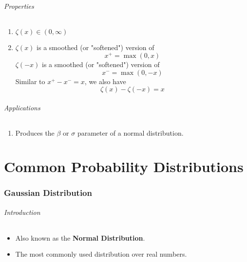 \documentclass[12pt, a4paper]{article}
\begin{document}
\paragraph{Properties}
\begin{enumerate}
    \item $\zeta(x) \in (0, \infty)$
    \item $\zeta(x)$ is a smoothed (or "softened") version of
        \[
            x^+ = \max(0, x)  
        \]
        $\zeta(-x)$ is a smoothed (or "softened") version of
        \[
            x^- = \max(0, -x)  
        \]
        Similar to $x^+ - x^- = x$, we also have
        \[
            \zeta(x) - \zeta(-x) = x
        \]
\end{enumerate}
\paragraph{Applications}
\begin{enumerate}
    \item Produces the $\beta$ or $\sigma$ parameter of a normal distribution.
\end{enumerate}


\newpage
\part{Common Probability Distributions}


\section{Gaussian Distribution}
\paragraph{Introduction}
\begin{itemize}
    \item Also known as the \textbf{Normal Distribution}.
    \item The most commonly used distribution over real numbers.
\end{itemize}
\end{document}
